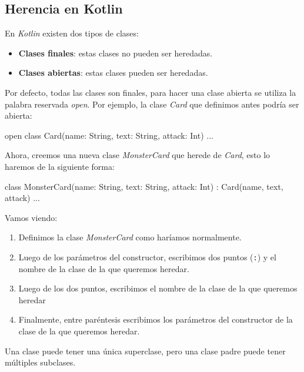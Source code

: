 
\subsection{Herencia en Kotlin}
  En \textit{Kotlin} existen dos tipos de clases:

  \begin{itemize}
    \item \textbf{Clases finales}: estas clases no pueden ser heredadas.
    \item \textbf{Clases abiertas}: estas clases pueden ser heredadas.
  \end{itemize}

  Por defecto, todas las clases son finales, para hacer una clase abierta se utiliza la palabra
  reservada \textit{open}.
  Por ejemplo, la clase \textit{Card} que definimos antes podría ser abierta:

  \begin{kotlin}
    open class Card(name: String, text: String, attack: Int) {...} 
  \end{kotlin}

  Ahora, creemos una nueva clase \textit{MonsterCard} que herede de \textit{Card}, esto lo haremos
  de la siguiente forma:
                        
  \begin{kotlin}
    class MonsterCard(name: String, text: String, attack: Int) : Card(name, text, attack) {
      ...
    }
  \end{kotlin}

  Vamos viendo:
  \begin{enumerate}
    \item Definimos la clase \textit{MonsterCard} como haríamos normalmente.
    \item Luego de los parámetros del constructor, escribimos dos puntos (\texttt{:}) y el nombre
      de la clase de la que queremos heredar.
    \item Luego de los dos puntos, escribimos el nombre de la clase de la que queremos heredar
    \item Finalmente, entre paréntesis escribimos los parámetros del constructor de la clase
      de la que queremos heredar.
  \end{enumerate}

  \begin{important}
    Una clase puede tener una única superclase, pero una clase padre puede tener múltiples
    subclases.
  \end{important}

